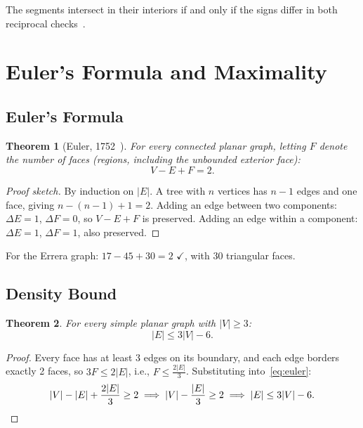 \documentclass[12pt,letterpaper]{article}
\theoremstyle{plain}
\newtheorem{theorem}{Theorem}[section]
\theoremstyle{definition}
\theoremstyle{remark}
\begin{document}
The segments intersect in their interiors if and only if the signs differ in both
reciprocal checks~\cite{shamos1976}.

\section{Euler's Formula and Maximality}

\subsection{Euler's Formula}

\begin{theorem}[Euler, 1752~\cite{euler1752}]
For every connected planar graph, letting $F$ denote the number of faces
(regions, including the unbounded exterior face):
\begin{equation}
    V - E + F = 2.
    \label{eq:euler}
\end{equation}
\end{theorem}

\begin{proof}[Proof sketch]
By induction on $|E|$. A tree with $n$ vertices has $n-1$ edges and one face,
giving $n - (n-1) + 1 = 2$. Adding an edge between two components:
$\Delta E = 1$, $\Delta F = 0$, so $V - E + F$ is preserved. Adding an edge
within a component: $\Delta E = 1$, $\Delta F = 1$, also preserved.
\end{proof}

For the Errera graph: $17 - 45 + 30 = 2$ $\checkmark$, with 30 triangular faces.

\subsection{Density Bound}

\begin{theorem}
\label{thm:density}
For every simple planar graph with $|V| \geq 3$:
\begin{equation}
    |E| \leq 3|V| - 6.
    \label{eq:density}
\end{equation}
\end{theorem}

\begin{proof}
Every face has at least 3 edges on its boundary, and each edge borders exactly 2
faces, so $3F \leq 2|E|$, i.e., $F \leq \frac{2|E|}{3}$.
Substituting into~\eqref{eq:euler}:
\[
    |V| - |E| + \frac{2|E|}{3} \geq 2
    \implies |V| - \frac{|E|}{3} \geq 2
    \implies |E| \leq 3|V| - 6. \qedhere
\]
\end{proof}
\end{document}
